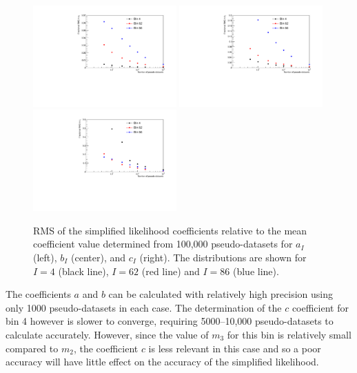 \documentclass[11pt]{article}
\begin{document}
\begin{figure}[t]
  \centering
  \includegraphics[width=0.49\textwidth]{figures/varAll_A}
  \includegraphics[width=0.49\textwidth]{figures/varAll_B}\\
  \includegraphics[width=0.49\textwidth]{figures/varAll_C}
  \caption{RMS of the simplified likelihood coefficients relative to the mean
    coefficient value determined from 100,000 pseudo-datasets for $a_{I}$
    (left), $b_{I}$ (center), and $c_{I}$ (right). The distributions are shown
    for $I=4$ (black line), $I=62$ (red line) and $I=86$ (blue line).}
  \label{fig:SLConvergence}
\end{figure}

The coefficients $a$ and $b$ can be calculated with relatively high precision using only 1000 pseudo-datasets in each case. The determination of 
the $c$ coefficient for bin 4 
however is slower to converge, requiring 5000--10,000 pseudo-datasets to calculate accurately. However, since the value of $m_{3}$ for this bin is 
relatively small compared to $m_{2}$, the coefficient $c$ is less relevant in this case and so a poor accuracy will have little effect on the accuracy of 
the simplified likelihood.
\end{document}

